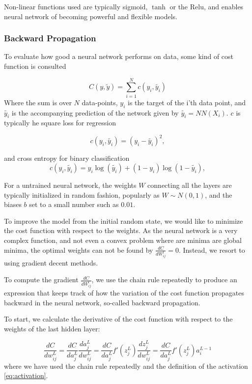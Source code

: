 Non-linear functions used are typically sigmoid, $\tanh$ or the Relu, and enables neural network of becoming powerful and flexible models.

\subsubsection{Backward Propagation}
To evaluate how good a neural network performs on data, some kind of 
cost function is consulted

\begin{equation}\label{eq:cost}
    C(y, \tilde{y}) = \sum_{i=1}^N c(y_i, \tilde{y_i}) 
\end{equation}
Where the sum is over $N$ data-points, $y_i$ is the target of the i'th data point,
and $\tilde{y_i}$ is the accompanying prediction of the network given by $\tilde{y_i} = NN(X_i)$. $c$ is typically he square loss for regression

\begin{equation}\label{eq:square_loss}
    c(y_i, \tilde{y_i}) = (y_i - \tilde{y_i})^2,
\end{equation}

and cross entropy for binary classification
\begin{equation}\label{eq:square_loss}
    c(y_i, \tilde{y_i}) = y_i\log(\tilde{y_i}) + (1 - y_i)\log(1 - \tilde{y_i}),
\end{equation}

For a untrained neural network, the weights $W$ connecting all the layers are typically initialized in random fashion, popularly as $W \sim N(0,1)$, and the biases $b$ set to a small number such as $0.01$. 

To improve the model from the initial random state, we would like to minimize the cost function with respect to the weights. As the neural network is a very complex function, and not even a convex problem where are minima are global minima, the optimal weights can not be found by $\frac{dC}{dW^l_{ij}} = 0$. Instead, we resort to using gradient decent methods.

To compute the gradient $\frac{dC}{dW^l_{ij}}$, we use the chain rule repeatedly to produce an expression that keeps track of how the variation of the cost function propagates backward in the neural network, so-called backward propagation.

To start, we calculate the derivative of the cost function with respect to the weights of the last hidden layer:

\begin{equation}\label{eq:gradient}
    \frac{dC}{dw^L_{ij}} = \frac{dC}{da_j^L} \frac{da_j^L}{dw^L_{ij}} 
    = \frac{dC}{da_j^L} f'(z_j^L) \frac{dz^L_j}{dw^L_{ij}} = \frac{dC}{da_j^L} f'(z_j^L) a^{L-1}_i
\end{equation}
where we have used the chain rule repeatedly and the definition of the activation \autoref{eq:activation}.


